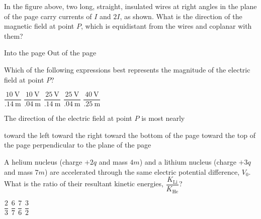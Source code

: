 \documentclass[12pt]{../oss-classkick-exam}
\begin{document}
\begin{questions}
  \question In the figure above, two long, straight, insulated wires at right
  angles in the plane of the page carry currents of $I$ and $2I$, as shown.
  What is the direction of the magnetic field at point $P$, which is
  equidistant from the wires and coplanar with them?
  \begin{choices}
    \choice Into the page
    \choice Out of the page
    \choice {\huge$\searrow$}
    \choice {\huge$\nwarrow$}
    \choice {\huge$\nearrow$}
  \end{choices}
  
  \question Which of the following expressions best represents the magnitude of
  the electric field at point $P$?
  \label{contour1}
  \begin{choices}
    \choice $\dfrac{\SI{10}{\volt}}{\SI{.14}{\metre}}$
    \choice $\dfrac{\SI{10}{\volt}}{\SI{.04}{\metre}}$
    \choice $\dfrac{\SI{25}{\volt}}{\SI{.14}{\metre}}$
    \choice $\dfrac{\SI{25}{\volt}}{\SI{.04}{\metre}}$
    \choice $\dfrac{\SI{40}{\volt}}{\SI{.25}{\metre}}$
  \end{choices}

  \question The direction of the electric field at point $P$ is most nearly
  \label{contour2}
  \begin{choices}
    \choice toward the left
    \choice toward the right
    \choice toward the bottom of the page
    \choice toward the top of the page
    \choice perpendicular to the plane of the page
  \end{choices}
  \newpage
  
  
  \question A helium nucleus (charge $+2q$ and mass $4m$) and a lithium nucleus
  (charge $+3q$ and mass $7m$) are accelerated through the same electric
  potential difference, $V_0$. What is the ratio of their resultant
  kinetic energies, $\dfrac{K_\text{Li}}{K_\text{He}}$?
  \begin{choices}
    \choice$\dfrac23$
    \choice$\dfrac67$
    \choice$\dfrac76$
    \choice$\dfrac32$
  \end{choices}
  \uplevel{ \rule{\linewidth}{.5pt}}
  

\end{questions}
\end{document}
